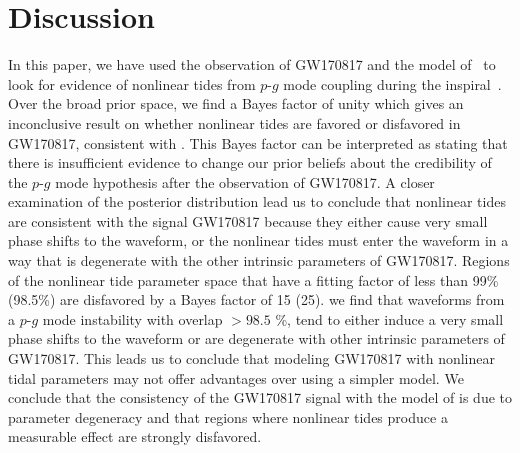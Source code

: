 \section{Discussion}
In this paper, we have used the observation of GW170817 and the model of~\cite{Essick:2016tkn} to look for evidence of nonlinear tides from $p$-$g$ mode coupling during the inspiral~\citep{Weinberg:2013pbi,Weinberg:2015pxa,Zhou:2018tvc}. Over the broad prior space, we find a Bayes factor of unity which gives an inconclusive result on whether nonlinear tides are favored or disfavored in GW170817, consistent with \cite{abbott2019constraining}. This Bayes factor can be interpreted as stating that there is insufficient evidence to change our prior beliefs about the credibility of the $p$-$g$ mode hypothesis after the observation of GW170817. A closer examination of the posterior distribution lead us to conclude that nonlinear tides are consistent with the signal GW170817 because they either cause very small phase shifts to the waveform, or the nonlinear tides must enter the waveform in a way that is degenerate with the other intrinsic parameters of GW170817. Regions of the nonlinear tide parameter space that have a fitting factor of less than 99\% (98.5\%) are  disfavored by a Bayes factor of 15 (25). we find that waveforms from a $p$-$g$ mode instability with overlap $>98.5$ \%, tend to either induce a very small phase shifts to the waveform or are degenerate with other intrinsic parameters of GW170817. This leads us to conclude that modeling GW170817 with nonlinear tidal parameters may not offer advantages over using a simpler model. We conclude that the consistency of the GW170817 signal with the model of \cite{Essick:2016tkn} is due to parameter degeneracy and that regions where nonlinear tides produce a measurable effect are strongly disfavored.

